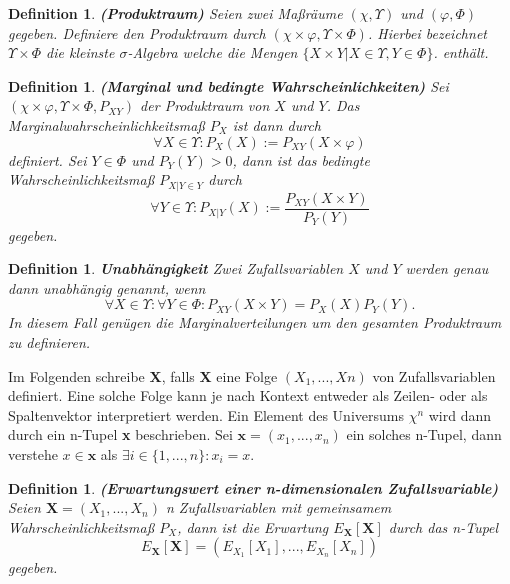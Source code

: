 \documentclass[12pt,a4paper]{scrartcl}
\newtheorem{Definition}[Satz]{Definition}
\numberwithin{equation}{section}
\begin{document}
{\begin{Definition}\textbf{(Produktraum)}
 Seien zwei Maßräume $(\chi,\varUpsilon)$ und $(\varphi,\Phi)$ gegeben. Definiere den 
 Produktraum durch $(\chi \times \varphi,\varUpsilon \times \Phi)$. Hierbei bezeichnet
 $\varUpsilon \times \Phi$ die kleinste $\sigma$-Algebra welche die Mengen $\textit{\{}X \times Y | X \in \varUpsilon, Y \in \Phi\textit{\}}$.
 enthält.
 \end{Definition}

\begin{Definition}\textbf{(Marginal und bedingte Wahrscheinlichkeiten)}
  Sei $(\chi \times \varphi,\varUpsilon \times \Phi, P_{XY})$ der Produktraum von $X$ und $Y$.
  Das Marginalwahrscheinlichkeitsmaß $P_{X}$ ist dann durch 
  $$
  \forall X \in \varUpsilon: P_{X}(X) := P_{XY}(X \times \varphi)
  $$
  definiert.
  Sei $Y \in \Phi$ und $P_{Y}(Y) > 0$, dann ist das bedingte Wahrscheinlichkeitsmaß $P_{X|Y \in Y}$ durch
  $$
  \forall Y \in \varUpsilon: P_{X|Y}(X) := \frac{P_{XY}(X \times Y)}{P_{Y}(Y)}
  $$
  gegeben.
\end{Definition}

\begin{Definition}\textbf{Unabhängigkeit}
  Zwei Zufallsvariablen $X$ und $Y$ werden genau dann unabhängig genannt, wenn 
  $$
  \forall X \in \varUpsilon: \forall Y \in \Phi: P_{XY}(X \times Y) = P_{X}(X)P_{Y}(Y).
  $$
  In diesem Fall genügen die Marginalverteilungen um den gesamten Produktraum zu definieren.
\end{Definition}
  
  Im Folgenden schreibe \textbf{X}, falls \textbf{X} eine Folge $(X_{1},...,X{n})$ von Zufallsvariablen
  definiert. Eine solche Folge kann je nach Kontext entweder als Zeilen- oder als Spaltenvektor interpretiert 
  werden. Ein Element des Universums $\chi^{n}$ wird dann durch ein n-Tupel \textbf{x} beschrieben.
  Sei $\textbf{x} = (x_{1},...,x_{n})$ ein solches n-Tupel, dann verstehe $x \in \textbf{x}$
  als $\exists i \in \textit{\{} 1,...,n \textit{\}}: x_{i} = x$. 

\begin{Definition}\textbf{(Erwartungswert einer n-dimensionalen Zufallsvariable)}
 Seien $\textbf{X} = (X_{1},...,X_{n})$ n Zufallsvariablen mit gemeinsamem Wahrscheinlichkeitsmaß $P_{X}$, 
 dann ist die Erwartung $E_{\textbf{X}}[\textbf{X}]$ durch das n-Tupel
 $$
 E_{\textbf{X}}[\textbf{X}] = (E_{X_{1}}[X_{1}],...,E_{X_{n}}[X_{n}])
 $$
 gegeben.
\end{Definition}

}
\end{document}
